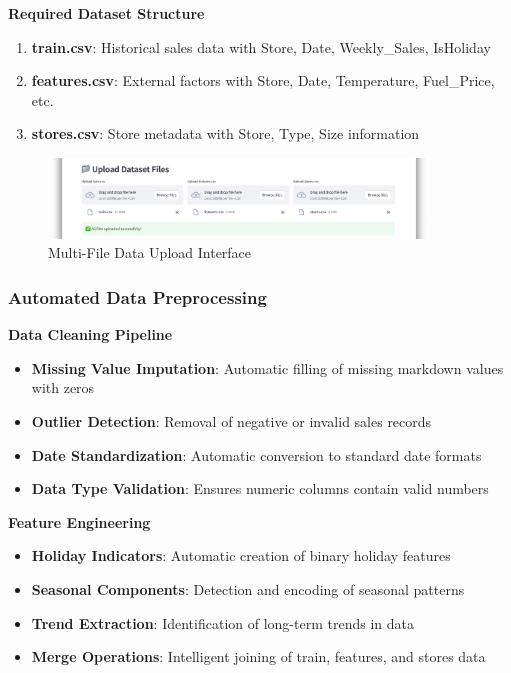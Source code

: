\textbf{Required Dataset Structure}
\begin{enumerate}
	\item \textbf{train.csv}: Historical sales data with Store, Date, Weekly\_Sales, IsHoliday
	\item \textbf{features.csv}: External factors with Store, Date, Temperature, Fuel\_Price, etc.
	\item \textbf{stores.csv}: Store metadata with Store, Type, Size information
\end{enumerate}

\begin{figure}[H]
	\centering
	\includegraphics[width=0.9\textwidth]{Images/05ApplicationFunctionsAndFeatures/DataUpload.png}
	\caption{Multi-File Data Upload Interface}
	\label{fig:data_upload}
\end{figure}

\subsubsection{Automated Data Preprocessing}

\textbf{Data Cleaning Pipeline}
\begin{itemize}
	\item \textbf{Missing Value Imputation}: Automatic filling of missing markdown values with zeros
	\item \textbf{Outlier Detection}: Removal of negative or invalid sales records
	\item \textbf{Date Standardization}: Automatic conversion to standard date formats
	\item \textbf{Data Type Validation}: Ensures numeric columns contain valid numbers
\end{itemize}

\textbf{Feature Engineering}
\begin{itemize}
	\item \textbf{Holiday Indicators}: Automatic creation of binary holiday features
	\item \textbf{Seasonal Components}: Detection and encoding of seasonal patterns
	\item \textbf{Trend Extraction}: Identification of long-term trends in data
	\item \textbf{Merge Operations}: Intelligent joining of train, features, and stores data
\end{itemize}

